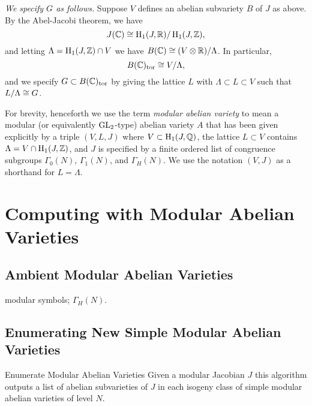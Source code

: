 \documentclass{article}
\begin{document}
{\em We specify $G$ as follows.}
Suppose $V$ defines an abelian subvariety $B$ of $J$ as above.
By the Abel-Jacobi theorem, we have
$$
 J(\mathbb{C}) \cong \operatorname{H}_1(J, \mathbb{R}) / \operatorname{H}_1(J,\mathbb{Z}),
$$
and letting $\Lambda = \operatorname{H}_1(J,\mathbb{Z}) \cap V$ we have
$B(\mathbb{C}) \cong (V\otimes\mathbb{R}) / \Lambda$.
In particular,
$$
  B(\mathbb{C})_{\operatorname{tor}} \cong V/\Lambda,
$$
and we specify $G\subset B(\mathbb{C})_{\operatorname{tor}}$ by giving the lattice $L$ with
$\Lambda \subset L\subset V$ such that $L/\Lambda \cong G$.


For brevity, henceforth we use the term {\em modular abelian variety}
to mean a modular (or equivalently $\operatorname{GL}_2$-type) abelian variety $A$
that has been given explicitly by a triple $(V,L,J)$ where $V\subset
\operatorname{H}_1(J,\mathbb{Q})$, the lattice $L\subset V$ contains $\Lambda = V\cap
\operatorname{H}_1(J,\mathbb{Z})$, and $J$ is specified by a finite ordered list of
congruence subgroups $\Gamma_0(N)$, $\Gamma_1(N)$, and $\Gamma_H(N)$.
We use the notation $(V,J)$ as a shorthand for $L=\Lambda$.



\section{Computing with Modular Abelian Varieties}

\subsection{Ambient Modular Abelian Varieties}
modular symbols; $\Gamma_H(N)$.


\subsection{Enumerating New Simple Modular Abelian Varieties}

\begin{algorithm}{Enumerate Modular Abelian Varieties}
  Given a modular Jacobian $J$ this algorithm outputs a list of
  abelian subvarieties of $J$ in each isogeny class of simple modular
  abelian varieties of level $N$.
\end{algorithm}
\end{document}
